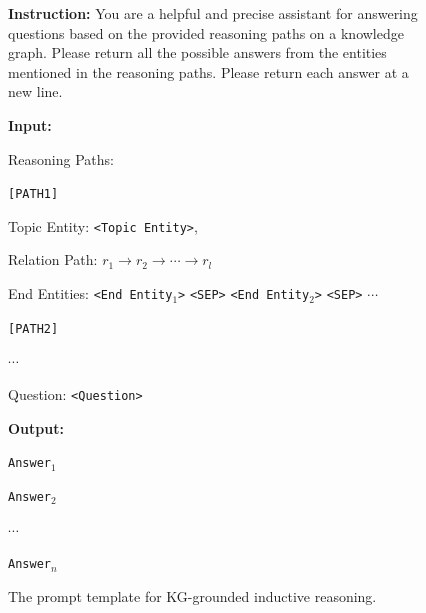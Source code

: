 \documentclass{article}
\begin{document}
\begin{figure}[h]
    \centering
    \begin{tcolorbox}[
        colback=gray!5,
        colframe=black!70,
        colbacktitle=black!70,
        coltitle=white,
        title=KG-grounded Inductive Reasoning Prompt,
        fonttitle=\bfseries,
        arc=2pt,
        boxrule=0.7pt,
        left=10pt,
        right=10pt,
        top=6pt,
        bottom=6pt,
        titlerule=0pt,
        width=0.95\linewidth
    ]
    \textbf{Instruction:} You are a helpful and precise assistant for answering questions based on the provided reasoning paths on a knowledge graph. Please return all the possible answers from the entities mentioned in the reasoning paths. Please return each answer at a new line.

    \vspace{0.5em}

    \textbf{Input:}

    \vspace{0.5em}
    
    Reasoning Paths: 

    \vspace{0.5em}
    
    \texttt{[PATH1]}
    
    Topic Entity: \texttt{<Topic Entity>}, 
    
    Relation Path: $r_1 \rightarrow r_2 \rightarrow \cdots \rightarrow r_l$ 
    
    End Entities: \texttt{<End Entity$_1$>} \texttt{<SEP>} \texttt{<End Entity$_2$>} \texttt{<SEP>} $\cdots$

    \vspace{0.5em}
    
    \texttt{[PATH2]}
    
    $\cdots$
    
    \vspace{0.5em}
    
    Question: \texttt{<Question>}

    \vspace{1em}

    \textbf{Output:}
    \vspace{0.5em}

    \texttt{Answer$_1$}
    
    \texttt{Answer$_2$}
    
    $\cdots$
    
    \texttt{Answer$_n$}
    \end{tcolorbox}

    \caption{The prompt template for KG-grounded inductive reasoning.}
    \label{fig:reasoning_prompt}
\end{figure}
\end{document}
